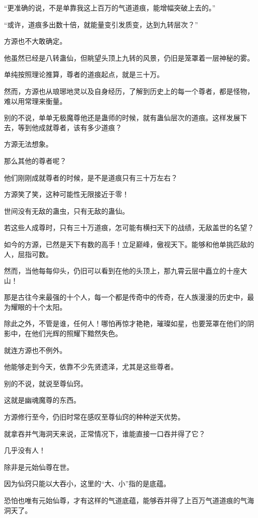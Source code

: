 \begin{this_body}
“更准确的说，不是单靠我这上百万的气道道痕，能增幅突破上去的。”

“或许，道痕多出数十倍，就能量变引发质变，达到九转层次？”

方源也不大敢确定。

他虽然已经是八转蛊仙，但眺望头顶上九转的风景，仍旧是笼罩着一层神秘的雾。

单纯按照理论推算，尊者的道痕起点，就是三十万。

然而，方源也从琅琊地灵以及自身经历，了解到历史上的每一个尊者，都是怪物，难以用常理来衡量。

别的不说，单单无极魔尊他还是蛊师的时候，就有蛊仙层次的道痕。这样发展下去，等到他成就尊者，该有多少道痕？

方源无法想象。

那么其他的尊者呢？

他们刚刚成就尊者的时候，是不是道痕只有三十万左右？

方源笑了笑，这种可能性无限接近于零！

世间没有无敌的蛊虫，只有无敌的蛊仙。

若这些人成尊时，只有三十万道痕，怎可能有横扫天下的战绩，无敌盖世的名望？

如今的方源，已然是天下有数的高手！立足巅峰，傲视天下。能够和他单挑匹敌的人，屈指可数。

然而，当他每每仰头，仍旧可以看到在他的头顶上，那九霄云层中矗立的十座大山！

那是古往今来最强的十个人，每一个都是传奇中的传奇，在人族漫漫的历史中，最为耀眼的十个太阳。

除此之外，不管是谁，任何人！哪怕再惊才艳艳，璀璨如星，也要笼罩在他们的阴影中，在他们光辉的照耀下黯然失色。

就连方源也不例外。

他能够走到今天，依靠不少先贤遗泽，尤其是这些尊者。

别的不说，就说至尊仙窍。

这就是幽魂魔尊的东西。

方源修行至今，仍旧时常在感叹至尊仙窍的种种逆天优势。

就拿吞并气海洞天来说，正常情况下，谁能直接一口吞并得了它？

几乎没有人！

除非是元始仙尊在世。

因为仙窍只能以大吞小，这里的“大、小”指的是底蕴。

恐怕也唯有元始仙尊，才有这样的气道底蕴，能够吞并得了上百万气道道痕的气海洞天了。


\end{this_body}
